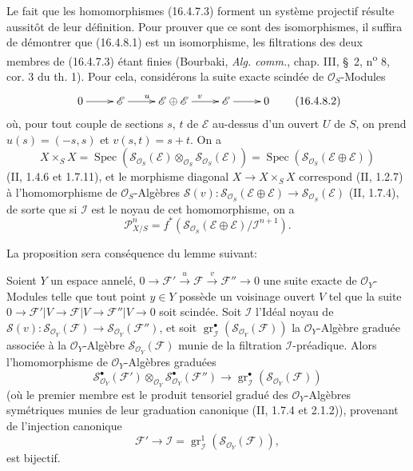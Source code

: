 Le fait que les homomorphismes (16.4.7.3) forment un système projectif résulte
aussitôt de leur définition. Pour prouver que ce sont des isomorphismes, il
suffira de
démontrer que (16.4.8.1) est un isomorphisme, les filtrations des deux membres de
(16.4.7.3) étant finies (Bourbaki, \emph{Alg. comm.}, chap. III, \S~2,
n\textsuperscript{o} 8, cor. 3 du th. 1). Pour cela, considérons la suite exacte
scindée de $\mathcal{O}_S$-Modules
\[
  \xymatrix{
    0 \ar[r] & \mathscr{E} \ar[r]^{u} &
    \mathscr{E}\oplus\mathscr{E} \ar[r]^{v} &
    \mathscr{E} \ar[r] & 0
  }
  \tag{16.4.8.2}
  \label{IV.16.4.8.2}
\]
où, pour tout couple de sections $s$, $t$ de $\mathscr{E}$ au-dessus d'un ouvert
$U$ de $S$, on prend $u(s)=(-s,s)$ et $v(s,t)=s+t$. On a
\[
  X\times_S X=\operatorname{Spec}
  (\mathscr{S}_{\mathcal{O}_S}(\mathscr{E})\otimes_{\mathcal{O}_S}
  \mathscr{S}_{\mathcal{O}_S}(\mathscr{E}))
  =\operatorname{Spec}(\mathscr{S}_{\mathcal{O}_S}
  (\mathscr{E}\oplus\mathscr{E}))
\]
(II, 1.4.6 et 1.7.11), et le morphisme diagonal $X\to X\times_S X$ correspond
(II, 1.2.7) à l'homomorphisme de $\mathcal{O}_S$-Algèbres
$\mathscr{S}(v):\mathscr{S}_{\mathcal{O}_S}(\mathscr{E}\oplus\mathscr{E})
\to\mathscr{S}_{\mathcal{O}_S}(\mathscr{E})$ (II, 1.7.4), de sorte que si
$\mathscr{I}$ est le noyau de cet homomorphisme, on a
\[
  \mathscr{P}_{X/S}^n=f^*(\mathscr{S}_{\mathcal{O}_S}
  (\mathscr{E}\oplus\mathscr{E})/\mathscr{I}^{n+1}).
\]

La proposition sera conséquence du lemme suivant:

\begin{lemma}[16.4.8.3]
\label{IV.16.4.8.3}
Soient $Y$ un espace annelé,
$0\to\mathscr{F}'\xrightarrow{u}\mathscr{F}\xrightarrow{v}\mathscr{F}''\to0$
une suite exacte de $\mathcal{O}_Y$-Modules telle que tout point $y\in Y$
possède un voisinage ouvert $V$ tel que la suite
$0\to\mathscr{F}'|V\to\mathscr{F}|V\to\mathscr{F}''|V\to0$ soit scindée.
Soit $\mathscr{I}$ l'Idéal noyau de
$\mathscr{S}(v):\mathscr{S}_{\mathcal{O}_Y}(\mathscr{F})\to
\mathscr{S}_{\mathcal{O}_Y}(\mathscr{F}'')$, et soit
$\operatorname{gr}_{\mathscr{I}}^\bullet
(\mathscr{S}_{\mathcal{O}_Y}(\mathscr{F}))$ la $\mathcal{O}_Y$-Algèbre graduée
associée à la $\mathcal{O}_Y$-Algèbre
$\mathscr{S}_{\mathcal{O}_Y}(\mathscr{F})$ munie de la filtration
$\mathscr{I}$-préadique. Alors l'homomorphisme de $\mathcal{O}_Y$-Algèbres
graduées
\[
  \mathscr{S}_{\mathcal{O}_Y}^{\bullet}(\mathscr{F}')
  \otimes_{\mathcal{O}_Y}
  \mathscr{S}_{\mathcal{O}_Y}^{\bullet}(\mathscr{F}'')
  \longrightarrow
  \operatorname{gr}_{\mathscr{I}}^\bullet
  (\mathscr{S}_{\mathcal{O}_Y}(\mathscr{F}))
  \tag{16.4.8.4}
  \label{IV.16.4.8.4}
\]
(où le premier membre est le produit tensoriel gradué des
$\mathcal{O}_Y$-Algèbres symétriques munies de leur graduation canonique
(II, 1.7.4 et 2.1.2)), provenant de l'injection canonique
\[
  \mathscr{F}'\longrightarrow\mathscr{I}
  =\operatorname{gr}_{\mathscr{I}}^1
  (\mathscr{S}_{\mathcal{O}_Y}(\mathscr{F})),
\]
est bijectif.
\end{lemma}

